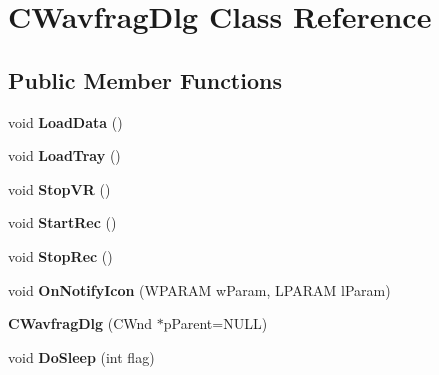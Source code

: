 \hypertarget{class_c_wavfrag_dlg}{\section{C\-Wavfrag\-Dlg Class Reference}
\label{class_c_wavfrag_dlg}
}
\subsection*{Public Member Functions}
\begin{DoxyCompactItemize}
\item 
\hypertarget{class_c_wavfrag_dlg_a5e9c14da6ebea4d3e6bca8a0a189149f}{void {\bfseries Load\-Data} ()}\label{class_c_wavfrag_dlg_a5e9c14da6ebea4d3e6bca8a0a189149f}

\item 
\hypertarget{class_c_wavfrag_dlg_a9f842aef85f516ec75e6c5372dcc6408}{void {\bfseries Load\-Tray} ()}\label{class_c_wavfrag_dlg_a9f842aef85f516ec75e6c5372dcc6408}

\item 
\hypertarget{class_c_wavfrag_dlg_a30442a43c95553c6499638d577c41e7b}{void {\bfseries Stop\-V\-R} ()}\label{class_c_wavfrag_dlg_a30442a43c95553c6499638d577c41e7b}

\item 
\hypertarget{class_c_wavfrag_dlg_a7bc446387f679d90a20ec9fc4663711b}{void {\bfseries Start\-Rec} ()}\label{class_c_wavfrag_dlg_a7bc446387f679d90a20ec9fc4663711b}

\item 
\hypertarget{class_c_wavfrag_dlg_a19a366377ac3a958c01520f483507950}{void {\bfseries Stop\-Rec} ()}\label{class_c_wavfrag_dlg_a19a366377ac3a958c01520f483507950}

\item 
\hypertarget{class_c_wavfrag_dlg_ae02e69236f2854bbb7c47ca01824e51d}{void {\bfseries On\-Notify\-Icon} (W\-P\-A\-R\-A\-M w\-Param, L\-P\-A\-R\-A\-M l\-Param)}\label{class_c_wavfrag_dlg_ae02e69236f2854bbb7c47ca01824e51d}

\item 
\hypertarget{class_c_wavfrag_dlg_a589f35f9759e2f470e6cf191a1ff4766}{{\bfseries C\-Wavfrag\-Dlg} (C\-Wnd $\ast$p\-Parent=N\-U\-L\-L)}\label{class_c_wavfrag_dlg_a589f35f9759e2f470e6cf191a1ff4766}

\item 
\hypertarget{class_c_wavfrag_dlg_a697c822367d7e5f417925893c6156ba8}{void {\bfseries Do\-Sleep} (int flag)}\label{class_c_wavfrag_dlg_a697c822367d7e5f417925893c6156ba8}


\end{DoxyCompactItemize}
